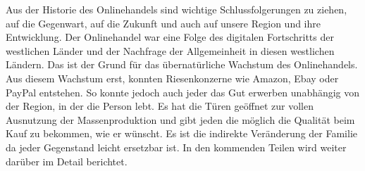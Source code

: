 Aus der Historie des Onlinehandels sind wichtige Schlussfolgerungen zu ziehen, auf die Gegenwart, auf die Zukunft und auch auf unsere Region und ihre Entwicklung. Der Onlinehandel war eine Folge des digitalen Fortschritts der westlichen Länder und der Nachfrage der Allgemeinheit in diesen westlichen Ländern. Das ist der Grund für das übernatürliche Wachstum des Onlinehandels. Aus diesem Wachstum erst, konnten Riesenkonzerne wie Amazon, Ebay oder PayPal entstehen. So konnte jedoch auch jeder das Gut erwerben unabhängig von der Region, in der die Person lebt. Es hat die Türen geöffnet zur vollen Ausnutzung der Massenproduktion und gibt jeden die möglich die Qualität beim Kauf zu bekommen, wie er wünscht. Es ist die indirekte Veränderung der Familie da jeder Gegenstand leicht ersetzbar ist. In den kommenden Teilen wird weiter darüber im Detail berichtet.
